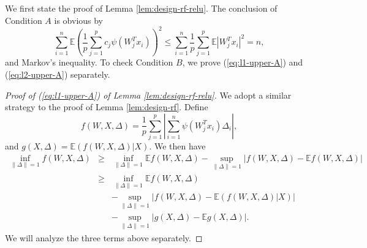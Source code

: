 We first state the proof of Lemma \ref{lem:design-rf-relu}.
The conclusion of Condition $A$ is obvious by
$$\sum_{i=1}^n\mathbb{E}\left(\frac{1}{p}\sum_{j=1}^pc_j\psi(W_j^Tx_i)\right)^2\leq \sum_{i=1}^n\frac{1}{p}\sum_{j=1}^p\mathbb{E}|W_j^Tx_i|^2= n,$$
and Markov's inequality. To check Condition $B$, we prove (\ref{eq:l1-upper-A}) and (\ref{eq:l2-upper-A}) separately.
\begin{proof}[Proof of (\ref{eq:l1-upper-A}) of Lemma \ref{lem:design-rf-relu}]
We adopt a similar strategy to the proof of Lemma \ref{lem:design-rf}. Define
$$f(W,X,\Delta)=\frac{1}{p}\sum_{j=1}^p\left|\sum_{i=1}^n\psi(W_j^Tx_i)\Delta_i\right|,$$
and $g(X,\Delta)=\mathbb{E}(f(W,X,\Delta)|X)$.
We then have
\begin{eqnarray}
\nonumber \inf_{\|\Delta\|=1}f(W,X,\Delta) &\geq& \inf_{\|\Delta\|=1}\mathbb{E}f(W,X,\Delta) - \sup_{\|\Delta\|=1}\left|f(W,X,\Delta)-\mathbb{E}f(W,X,\Delta)\right| \\
\label{eq:exp-f-inf} &\geq& \inf_{\|\Delta\|=1}\mathbb{E}f(W,X,\Delta) \\
\label{eq:ep-f} && - \sup_{\|\Delta\|=1}\left|f(W,X,\Delta)-\mathbb{E}(f(W,X,\Delta)|X)\right| \\
\label{eq:ep-g} && - \sup_{\|\Delta\|=1}\left|g(X,\Delta)-\mathbb{\mathbb{E}}g(X,\Delta)\right|.
\end{eqnarray}
We will analyze the three terms above separately.


\end{proof}
